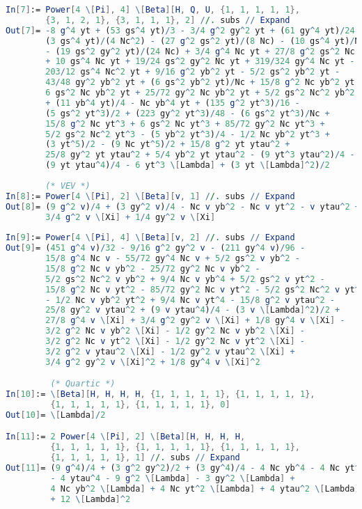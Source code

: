 \documentclass{scrartcl}
\begin{document}
\begin{lstlisting}[language=mathematica,mathescape,columns=flexible,backgroundcolor=\color{light-gray}]
In[7]:= Power[4 \[Pi], 4] \[Beta][H, Q, U, {1, 1, 1, 1, 1}, 
        {3, 1, 2, 1}, {3, 1, 1, 1}, 2] //. subs // Expand
Out[7]= -8 g^4 yt + (53 gs^4 yt)/3 - 3/4 g^2 gy^2 yt + (61 gy^4 yt)/24 - 
        (3 gs^4 yt)/(4 Nc^2) - (27 g^2 gs^2 yt)/(8 Nc) - (10 gs^4 yt)/Nc
        - (19 gs^2 gy^2 yt)/(24 Nc) + 3/4 g^4 Nc yt + 27/8 g^2 gs^2 Nc yt
        + 10 gs^4 Nc yt + 19/24 gs^2 gy^2 Nc yt + 319/324 gy^4 Nc yt - 
        203/12 gs^4 Nc^2 yt + 9/16 g^2 yb^2 yt - 5/2 gs^2 yb^2 yt - 
        43/48 gy^2 yb^2 yt + (6 gs^2 yb^2 yt)/Nc + 15/8 g^2 Nc yb^2 yt -
        6 gs^2 Nc yb^2 yt + 25/72 gy^2 Nc yb^2 yt + 5/2 gs^2 Nc^2 yb^2 yt
        + (11 yb^4 yt)/4 - Nc yb^4 yt + (135 g^2 yt^3)/16 - 
        (5 gs^2 yt^3)/2 + (223 gy^2 yt^3)/48 - (6 gs^2 yt^3)/Nc + 
        15/8 g^2 Nc yt^3 + 6 gs^2 Nc yt^3 + 85/72 gy^2 Nc yt^3 + 
        5/2 gs^2 Nc^2 yt^3 - (5 yb^2 yt^3)/4 - 1/2 Nc yb^2 yt^3 + 
        (3 yt^5)/2 - (9 Nc yt^5)/2 + 15/8 g^2 yt ytau^2 + 
        25/8 gy^2 yt ytau^2 + 5/4 yb^2 yt ytau^2 - (9 yt^3 ytau^2)/4 - 
        (9 yt ytau^4)/4 - 6 yt^3 \[Lambda] + (3 yt \[Lambda]^2)/2
        
        (* VEV *)
In[8]:= Power[4 \[Pi], 2] \[Beta][v, 1] //. subs // Expand
Out[8]= (9 g^2 v)/4 + (3 gy^2 v)/4 - Nc v yb^2 - Nc v yt^2 - v ytau^2 + 
        3/4 g^2 v \[Xi] + 1/4 gy^2 v \[Xi]
        
In[9]:= Power[4 \[Pi], 4] \[Beta][v, 2] //. subs // Expand
Out[9]= (451 g^4 v)/32 - 9/16 g^2 gy^2 v - (211 gy^4 v)/96 - 
        15/8 g^4 Nc v - 55/72 gy^4 Nc v + 5/2 gs^2 v yb^2 - 
        15/8 g^2 Nc v yb^2 - 25/72 gy^2 Nc v yb^2 - 
        5/2 gs^2 Nc^2 v yb^2 + 9/4 Nc v yb^4 + 5/2 gs^2 v yt^2 - 
        15/8 g^2 Nc v yt^2 - 85/72 gy^2 Nc v yt^2 - 5/2 gs^2 Nc^2 v yt^2 
        - 1/2 Nc v yb^2 yt^2 + 9/4 Nc v yt^4 - 15/8 g^2 v ytau^2 - 
        25/8 gy^2 v ytau^2 + (9 v ytau^4)/4 - (3 v \[Lambda]^2)/2 + 
        27/8 g^4 v \[Xi] + 3/4 g^2 gy^2 v \[Xi] + 1/8 gy^4 v \[Xi] - 
        3/2 g^2 Nc v yb^2 \[Xi] - 1/2 gy^2 Nc v yb^2 \[Xi] - 
        3/2 g^2 Nc v yt^2 \[Xi] - 1/2 gy^2 Nc v yt^2 \[Xi] - 
        3/2 g^2 v ytau^2 \[Xi] - 1/2 gy^2 v ytau^2 \[Xi] + 
        3/4 g^2 gy^2 v \[Xi]^2 + 1/8 gy^4 v \[Xi]^2

         (* Quartic *)
In[10]:= \[Beta][H, H, H, H, {1, 1, 1, 1, 1}, {1, 1, 1, 1, 1}, 
         {1, 1, 1, 1, 1}, {1, 1, 1, 1, 1}, 0]
Out[10]= \[Lambda]/2

In[11]:= 2 Power[4 \[Pi], 2] \[Beta][H, H, H, H, 
         {1, 1, 1, 1, 1}, {1, 1, 1, 1, 1}, {1, 1, 1, 1, 1}, 
         {1, 1, 1, 1, 1}, 1] //. subs // Expand
Out[11]= (9 g^4)/4 + (3 g^2 gy^2)/2 + (3 gy^4)/4 - 4 Nc yb^4 - 4 Nc yt^4 
         - 4 ytau^4 - 9 g^2 \[Lambda] - 3 gy^2 \[Lambda] + 
         4 Nc yb^2 \[Lambda] + 4 Nc yt^2 \[Lambda] + 4 ytau^2 \[Lambda] 
         + 12 \[Lambda]^2


\end{lstlisting}
\end{document}
